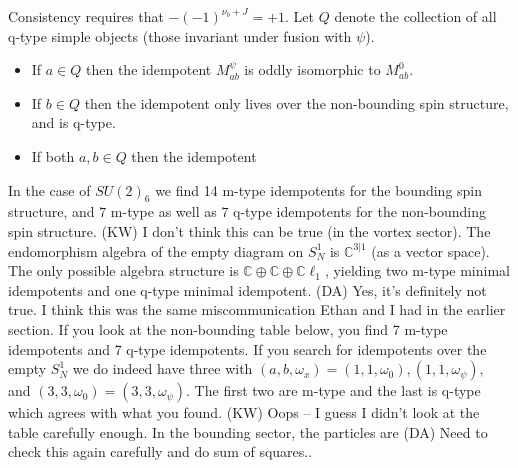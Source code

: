 \documentclass[12pt,a4paper]{article}
\newcommand{\cc}{\mathbb{C}}
\newcommand{\cl}{\mathbb{C}\ell}
\newcommand{\dave}[1]{{\color{ao(english)}\footnotesize{(DA) #1}}}
\newcommand{\kw}[1]{{\color{kwcolor}\footnotesize{(KW) #1}}}
\begin{document}
Consistency requires that $-(-1)^{\nu_b + J} = +1$.
Let $Q$ denote the collection of all q-type simple objects (those invariant under fusion with $\psi$). 
\begin{itemize}
\item If $a \in Q$ then the idempotent $M_{ab}^\psi$ is oddly isomorphic to $M_{ab}^0$.
\item If $b \in Q$ then the idempotent only lives over the non-bounding spin structure, and is q-type. 
\item If both $a,b \in Q$ then the idempotent 
\end{itemize}

In the case of $SU(2)_6$ we find 14 m-type idempotents for the bounding spin structure, 
and $7$ m-type as well as $7$ q-type idempotents for the non-bounding spin structure. 
\kw{I don't think this can be true (in the vortex sector).
The endomorphism algebra of the empty diagram on $S^1_N$ is $\cc^{3|1}$ (as a vector space).
The only possible algebra structure is $\cc\oplus\cc\oplus\cl_1$, yielding 
two m-type minimal idempotents and one q-type minimal idempotent.}
\dave{Yes, it's definitely not true. 
I think this was the same miscommunication Ethan and I had in the earlier section. 
If you look at the non-bounding table below, you find 7 m-type idempotents and 7 q-type idempotents. 
If you search for idempotents over the empty $S^1_N$ 
we do indeed have three with $(a,b, \omega_x) = (1,1,\omega_0), (1,1,\omega_\psi),$ and $(3,3, \omega_0) = (3,3,\omega_\psi)$. 
The first two are m-type and the last is q-type which agrees with what you found.}
\kw{Oops -- I guess I didn't look at the table carefully enough.}
In the bounding sector, the particles are
\dave{Need to check this again carefully and do sum of squares..}
\end{document}
